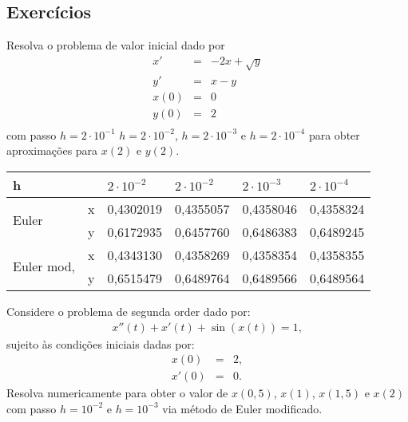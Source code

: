 \subsection*{Exercícios}

\begin{exer}Resolva o problema de valor inicial dado por
\begin{eqnarray*}
x'&=& -2x + \sqrt{y}\\
y'&=& x - y\\
x(0)&=&0\\
y(0)&=&2\\
\end{eqnarray*}
com passo $h=2\cdot 10^{-1}$ $h=2\cdot 10^{-2}$, $h=2\cdot 10^{-3}$ e $h=2\cdot 10^{-4}$ para obter aproximações para $x(2)$ e $y(2)$.  
\end{exer}
\begin{resp}
 
 \begin{center}
 \begin{tabular}{|l|l|l|l|l|l|}%
\hline
   h                   & &$2\cdot 10^{-2}$&$2\cdot 10^{-2}$&$2\cdot 10^{-3}$&$2\cdot 10^{-4}$\\
   \hline
 \multirow{2}{*}{Euler}&x&0,4302019&0,4355057&0,4358046&0,4358324\\
                       &y& 0,6172935&0,6457760&0,6486383&0,6489245\\
  \hline
 
 \multirow{2}{*}{Euler mod,}&x&  0,4343130&0,4358269&0,4358354&0,4358355\\
                       &y& 0,6515479&0,6489764&0,6489566&0,6489564 \\

   \hline
   
 
 \end{tabular}
\end{center}
\end{resp}

\begin{exer} Considere o problema de segunda order dado por:
\begin{eqnarray*}
 x''(t)+x'(t)+\sin(x(t))=1,
\end{eqnarray*}
sujeito às condições iniciais dadas por:
\begin{eqnarray*}
x(0)&=&2,\\
x'(0)&=&0.
\end{eqnarray*}
Resolva numericamente para obter o valor de $x(0,5)$, $x(1)$, $x(1,5)$ e $x(2)$ com passo $h=10^{-2}$ e $h=10^{-3}$ via método de Euler modificado.
\end{exer}

